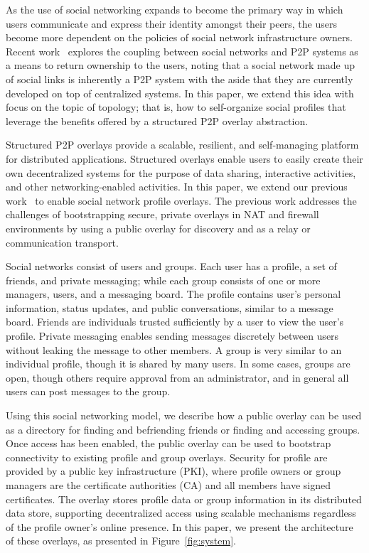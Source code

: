 \documentclass[conference]{IEEEtran}
\begin{document}
As the use of social networking expands to become the primary way in which
users communicate and express their identity amongst their peers, the users
become more dependent on the policies of social network infrastructure owners.
Recent work~\cite{p2p_socialnetwork} explores the coupling between social
networks and P2P systems as a means to return ownership to the users, noting
that a social network made up of social links is inherently a P2P system with
the aside that they are currently developed on top of centralized systems.  In
this paper, we extend this idea with focus on the topic of topology; that is,
how to self-organize social profiles that leverage the benefits offered by a
structured P2P overlay abstraction.

Structured P2P overlays provide a scalable, resilient, and self-managing
platform for distributed applications.  Structured overlays enable users to
easily create their own decentralized systems for the purpose of data sharing,
interactive activities, and other networking-enabled activities.  In this
paper, we extend our previous work~\cite{vpo} to enable social network profile
overlays.  The previous work addresses the challenges of bootstrapping secure,
private overlays in NAT and firewall environments by using a public overlay
for discovery and as a relay or communication transport.  

Social networks consist of users and groups.  Each user has a profile, a set
of friends, and private messaging; while each group consists of one or more
managers, users, and a messaging board.  The profile contains user's personal
information, status updates, and public conversations, similar to a message
board.  Friends are individuals trusted sufficiently by a user to view the
user's profile.  Private messaging enables sending messages discretely between
users without leaking the message to other members.  A group is very similar
to an individual profile, though it is shared by many users.  In some cases,
groups are open, though others require approval from an administrator, and in
general all users can post messages to the group.  

Using this social networking model, we describe how a public overlay can be
used as a directory for finding and befriending friends or finding and
accessing groups.  Once access has been enabled, the public overlay can be used
to bootstrap connectivity to existing profile and group overlays.  Security for
profile are provided by a public key infrastructure (PKI), where profile owners
or group managers are the certificate authorities (CA) and all members have
signed certificates.  The overlay stores profile data or group information in
its distributed data store, supporting decentralized access using scalable
mechanisms regardless of the profile owner's online presence.  In this paper,
we present the architecture of these overlays, as presented in
Figure~\ref{fig:system}.
\end{document}
